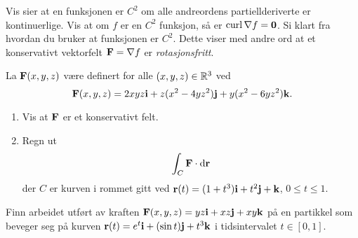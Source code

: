 \oppgave[V2013, Oppgave 4] Vis sier at en funksjonen er $C^2$ om alle
andreordens partiellderiverte er kontinuerlige. Vis at om $f$ er en $C^2$
funksjon, så er $\operatorname{curl} \nabla f = \mathbf{0}$. Si klart fra hvordan du bruker at
funksjonen er $C^2$. Dette viser med andre ord at et konservativt vektorfelt
$\mathbf{F} = \nabla f$ er \emph{rotasjonsfritt}.


\oppgave[K2012, Oppgave 1] La $\mathbf{F}(x,y,z)$ være definert for alle $(x,y,z)
\in \mathbb{R}^3$ ved
% 
\begin{equation*}
  \mathbf{F}(x,y,z) = 2xyz \mathbf{i} + z(x^2 - 4yz^2)\mathbf{j} + y(x^2 - 6yz^2)\mathbf{k}.
\end{equation*}
%
\begin{enumerate}
  \item Vis at $\mathbf{F}$ er et konservativt felt.
  \item Regn ut
    \begin{equation*}
      \int_C \vek{F} \cdot \dd\vek{r}
    \end{equation*}
    der $C$ er kurven i rommet gitt ved $\mathbf{r}(t) = (1+t^3)\mathbf{i} + t^2\mathbf{j} + \mathbf{k}$,
    $0 \leq t \leq 1$.
\end{enumerate}

\oppgave[V2012, Oppgave 7] Finn arbeidet utført av kraften $\mathbf{F}(x,y,z) =
yz\mathbf{i} + xz\mathbf{j} + xy\mathbf{k}$ på en partikkel som beveger seg på kurven $\mathbf{r}(t) =
e^t\mathbf{i} + (\sin t)\mathbf{j} + t^3\mathbf{k}$ i tidsintervalet $t \in [0, 1]$.

